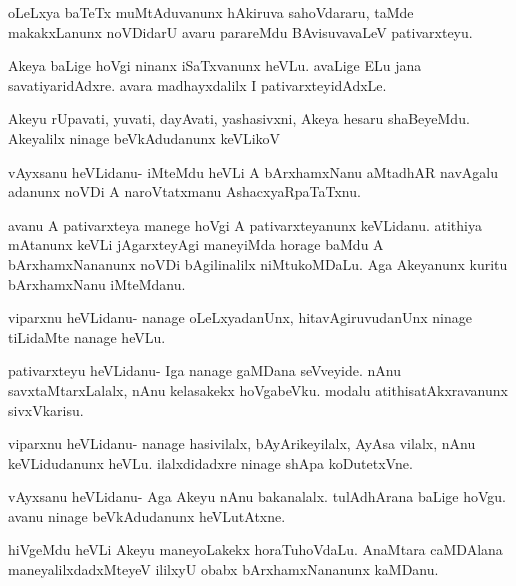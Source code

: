 \documentclass{article}
\begin{document}
\begin{mng}%
oLeLxya baTeTx muMtAduvanunx hAkiruva sahoVdararu, taMde
makakxLanunx noVDidarU avaru parareMdu BAvisuvavaLeV pativarxteyu.
\end{mng}

\begin{mng}%
Akeya baLige hoVgi ninanx iSaTxvanunx heVLu. avaLige ELu
jana savatiyaridAdxre. avara madhayxdalilx I pativarxteyidAdxLe.
\end{mng}

\begin{mng}%
Akeyu rUpavati, yuvati, dayAvati, yashasivxni, Akeya
hesaru shaBeyeMdu. Akeyalilx ninage beVkAdudanunx keVLikoV
\end{mng}

\begin{mng}%
vAyxsanu heVLidanu- iMteMdu heVLi A bArxhamxNanu aMtadhAR
navAgalu adanunx noVDi A naroVtatxmanu AshacxyaRpaTaTxnu.
\end{mng}

\begin{mng}%
avanu A pativarxteya manege hoVgi A pativarxteyanunx
keVLidanu. atithiya mAtanunx keVLi jAgarxteyAgi maneyiMda horage
baMdu A bArxhamxNananunx noVDi bAgilinalilx niMtukoMDaLu. Aga Akeyanunx 
kuritu bArxhamxNanu iMteMdanu.
\end{mng}

\begin{mng}%
viparxnu heVLidanu- nanage oLeLxyadanUnx, hitavAgiruvudanUnx
ninage tiLidaMte nanage heVLu.
\end{mng}

\begin{mng}%
pativarxteyu heVLidanu- Iga nanage gaMDana seVveyide. nAnu
savxtaMtarxLalalx, nAnu kelasakekx hoVgabeVku. modalu atithisatAkxravanunx
sivxVkarisu.
\end{mng}

\begin{mng}%
viparxnu heVLidanu- nanage hasivilalx, bAyArikeyilalx, AyAsa
vilalx, nAnu keVLidudanunx heVLu. ilalxdidadxre ninage shApa koDutetxVne.
\end{mng}

\begin{mng}%
vAyxsanu heVLidanu- Aga Akeyu nAnu bakanalalx. tulAdhArana
baLige hoVgu. avanu ninage beVkAdudanunx heVLutAtxne.
\end{mng}

\begin{mng}%
hiVgeMdu heVLi Akeyu maneyoLakekx horaTuhoVdaLu.
AnaMtara caMDAlana maneyalilxdadxMteyeV ililxyU obabx bArxhamxNananunx
kaMDanu.
\end{mng}
\end{document}
